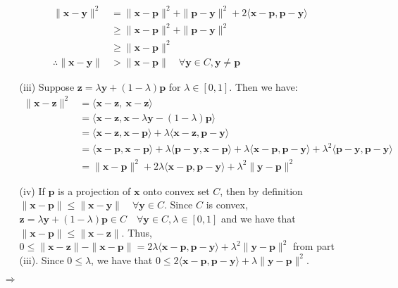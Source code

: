 \documentclass[letterpaper,12pt]{article}
\theoremstyle{definition}
\begin{document}
\begin{enumerate}
\begin{enumerate}
        \begin{align*}
          \|\mathbf{x}-\mathbf{y}\|^2&=\|\mathbf{x}-\mathbf{p}\|^2+\|\mathbf{p}-\mathbf{y}\|^2 + 2\langle\mathbf{x}-\mathbf{p},\mathbf{p}-\mathbf{y}\rangle \\
          &\geq \|\mathbf{x}-\mathbf{p}\|^2+\|\mathbf{p}-\mathbf{y}\|^2 \\
          &\geq  \|\mathbf{x}-\mathbf{p}\|^2 \\
          \therefore \|\mathbf{x}-\mathbf{y}\| &> \|\mathbf{x}-\mathbf{p}\| \quad \forall \mathbf{y}\in C, \mathbf{y}\neq\mathbf{p}
        \end{align*}
      \item[(iii)]
        Suppose $\mathbf{z}=\lambda\mathbf{y}+(1-\lambda)\mathbf{p}$ for $\lambda\in[0,1]$. Then we have:
        \begin{align*}
          \|\mathbf{x}-\mathbf{z}\|^2 &= \langle \mathbf{x}-\mathbf{z},\ \mathbf{x}-\mathbf{z}\rangle \\
          &= \langle \mathbf{x}-\mathbf{z},\mathbf{x}-\lambda\mathbf{y}-(1-\lambda)\mathbf{p} \rangle \\
          &= \langle \mathbf{x}-\mathbf{z}, \mathbf{x}-\mathbf{p} \rangle + \lambda \langle\mathbf{x}-\mathbf{z}, \mathbf{p}-\mathbf{y} \rangle \\
          &= \langle \mathbf{x}-\mathbf{p},\mathbf{x}-\mathbf{p} \rangle + \lambda \langle \mathbf{p}-\mathbf{y}, \mathbf{x}-\mathbf{p}\rangle + \lambda\langle \mathbf{x}-\mathbf{p},\mathbf{p}-\mathbf{y} \rangle + \lambda^2\langle \mathbf{p}-\mathbf{y},\mathbf{p}-\mathbf{y}\rangle \\
          &= \|\mathbf{x}-\mathbf{p}\|^2+2\lambda\langle \mathbf{x}-\mathbf{p},\mathbf{p}-\mathbf{y} \rangle + \lambda^2\|\mathbf{y}-\mathbf{p}\|^2
        \end{align*}
      \item[(iv)]
        If $\mathbf{p}$ is a projection of $\mathbf{x}$ onto convex set $C$, then by definition $\|\mathbf{x}-\mathbf{p}\| \leq \|\mathbf{x}-\mathbf{y}\| \quad\forall \mathbf{y} \in C$. Since $C$ is convex, $\mathbf{z} = \lambda\mathbf{y}+(1-\lambda)\mathbf{p} \in C \quad\forall \mathbf{y}\in C, \lambda \in[0,1]$ and we have that $\|\mathbf{x}-\mathbf{p}\| \leq \|\mathbf{x}-\mathbf{z}\|$. Thus, $0 \leq \|\mathbf{x}-\mathbf{z}\|-\|\mathbf{x}-\mathbf{p}\| = 2\lambda\langle \mathbf{x}-\mathbf{p},\mathbf{p}-\mathbf{y} \rangle + \lambda^2\|\mathbf{y}-\mathbf{p}\|^2$ from part (iii). Since $0 \leq \lambda$, we have that $0 \leq 2\langle \mathbf{x}-\mathbf{p},\mathbf{p}-\mathbf{y} \rangle + \lambda\|\mathbf{y}-\mathbf{p}\|^2$.
    \end{enumerate}
    $\Longrightarrow$


\end{enumerate}
\end{document}
